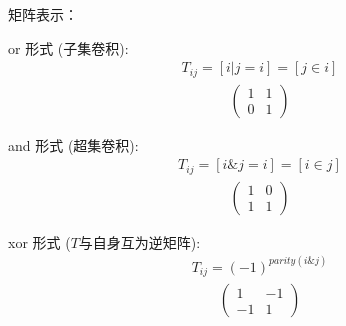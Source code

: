 矩阵表示：

or 形式 (子集卷积):
$$\begin{aligned}T_{ij} = [i|j=i] = [j \in i]\end{aligned}$$
$$
\begin{aligned}
\begin{pmatrix}
    1&1\\0&1
\end{pmatrix}
\end{aligned}
$$

and 形式 (超集卷积):
$$\begin{aligned}T_{ij} = [i\&j=i] = [i \in j]\end{aligned}$$
$$
\begin{aligned}
\begin{pmatrix}
    1&0\\1&1
\end{pmatrix}
\end{aligned}
$$

xor 形式 ($T$与自身互为逆矩阵):
$$\begin{aligned}T_{ij} = (-1)^{parity(i\&j)}\end{aligned}$$
$$
\begin{aligned}
\begin{pmatrix}
    1&-1\\-1&1
\end{pmatrix}
\end{aligned}
$$

\inputminted{cpp}{../src-midori/math/FWT.cpp}






